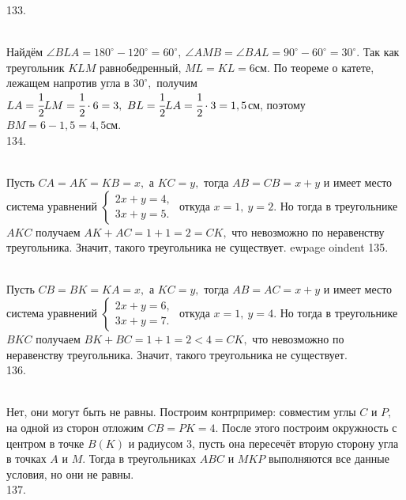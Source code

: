 133. \begin{figure}[ht!]
\end{figure}\\
Найдём $\angle BLA=180^\circ-120^\circ=60^\circ,\ \angle AMB=\angle BAL=90^\circ-60^\circ=30^\circ.$ Так как треугольник $KLM$ равнобедренный, $ML=KL=6$см. По теореме о катете, лежащем напротив угла в $30^\circ,$ получим $LA=\cfrac{1}{2}LM=\cfrac{1}{2}\cdot6=3,\ BL=\cfrac{1}{2}LA=\cfrac{1}{2}\cdot3=1,5$см, поэтому $BM=6-1,5=4,5$см.\\
134. \begin{figure}[ht!]
\end{figure}\\
Пусть $CA=AK=KB=x,$ а $KC=y,$ тогда $AB=CB=x+y$ и имеет место система уравнений $\begin{cases} 2x+y=4,\\ 3x+y=5.\end{cases}$ откуда $x=1,\ y=2.$ Но тогда в треугольнике $AKC$ получаем $AK+AC=1+1=2=CK,$ что невозможно по неравенству треугольника. Значит, такого треугольника не существует.
ewpage
oindent
135. \begin{figure}[ht!]
\end{figure}\\
Пусть $CB=BK=KA=x,$ а $KC=y,$ тогда $AB=AC=x+y$ и имеет место система уравнений $\begin{cases} 2x+y=6,\\ 3x+y=7.\end{cases}$ откуда $x=1,\ y=4.$ Но тогда в треугольнике $BKC$ получаем $BK+BC=1+1=2<4=CK,$ что невозможно по неравенству треугольника. Значит, такого треугольника не существует.\\
136. \begin{figure}[ht!]
\end{figure}\\
Нет, они могут быть не равны. Построим контрпример: совместим углы $C$ и $P,$ на одной из сторон отложим $CB=PK=4.$ После этого построим окружность с центром в точке $B(K)$ и радиусом 3, пусть она пересечёт вторую сторону угла в точках $A$ и $M.$ Тогда в треугольниках $ABC$ и $MKP$ выполняются все данные условия, но они не равны.\\
137. \begin{figure}[ht!]
\end{figure}\\
